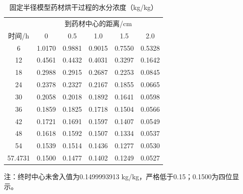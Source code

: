 \begin{table}[htbp]\centering\small
\caption{固定半径模型药材烘干过程的水分浓度（kg/kg）}\label{tab_q3C}
\renewcommand{\arraystretch}{1.12}
\begin{tabular}{cccccc}\toprule
 & \multicolumn{5}{c}{到药材中心的距离/cm}\\
时间/h & 0 & 0.5 & 1.0 & 1.5 & 2.0\\\midrule
6 & 1.0170 & 0.9881 & 0.9015 & 0.7550 & 0.5328\\
12 & 0.4561 & 0.4432 & 0.4031 & 0.3297 & 0.1642\\
18 & 0.2988 & 0.2915 & 0.2687 & 0.2253 & 0.0845\\
24 & 0.2378 & 0.2327 & 0.2167 & 0.1855 & 0.0665\\
30 & 0.2058 & 0.2018 & 0.1892 & 0.1641 & 0.0598\\
36 & 0.1859 & 0.1825 & 0.1718 & 0.1504 & 0.0566\\
42 & 0.1721 & 0.1691 & 0.1597 & 0.1407 & 0.0549\\
48 & 0.1618 & 0.1592 & 0.1507 & 0.1334 & 0.0537\\
54 & 0.1539 & 0.1514 & 0.1436 & 0.1277 & 0.0530\\
57.4731 & 0.1500 & 0.1477 & 0.1402 & 0.1249 & 0.0527\\
\bottomrule\end{tabular}
\par\vspace{3pt}\begin{minipage}{.96\linewidth}\footnotesize 注：终时中心未舍入值为0.1499993913 kg/kg，严格低于0.15；0.1500为四位显示。\end{minipage}
\end{table}
